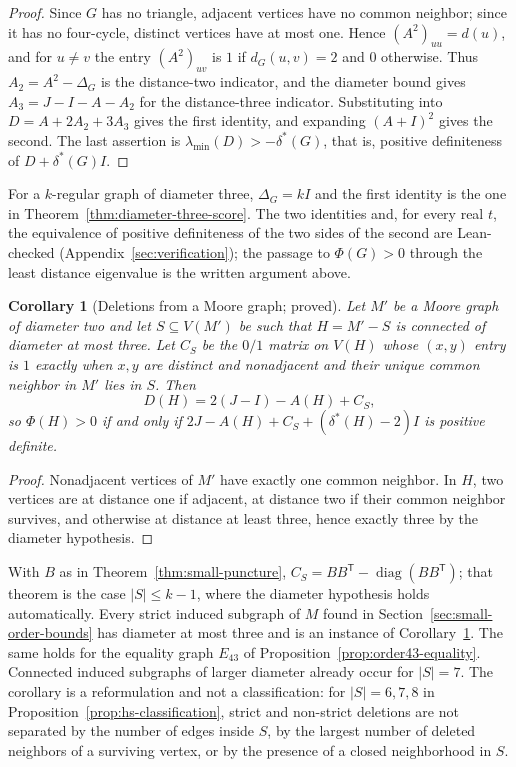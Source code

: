 \documentclass[a4paper,10pt,reqno]{amsart}
\theoremstyle{plain}
\newtheorem{corollary}[theorem]{Corollary}
\theoremstyle{definition}
\theoremstyle{remark}
\begin{document}
\begin{proof}
Since \(G\) has no triangle, adjacent vertices have no common neighbor; since
it has no four-cycle, distinct vertices have at most one. Hence \((A^2)_{uu}=d(u)\),
and for \(u\ne v\) the entry \((A^2)_{uv}\) is \(1\) if \(d_G(u,v)=2\) and \(0\)
otherwise. Thus \(A_2=A^2-\Delta_G\) is the distance-two indicator, and the
diameter bound gives \(A_3=J-I-A-A_2\) for the distance-three indicator.
Substituting into \(D=A+2A_2+3A_3\) gives the first identity, and expanding
\((A+I)^2\) gives the second. The last assertion is
\(\lambda_{\min}(D)>-\delta^*(G)\), that is, positive definiteness of
\(D+\delta^*(G)I\).
\end{proof}

For a \(k\)-regular graph of diameter three, \(\Delta_G=kI\) and the first
identity is the one in Theorem~\ref{thm:diameter-three-score}. The two
identities and, for every real \(t\), the equivalence of positive
definiteness of the two sides of the second are Lean-checked
(Appendix~\ref{sec:verification}); the passage to \(\Phi(G)>0\) through the
least distance eigenvalue is the written argument above.

\begin{corollary}[Deletions from a Moore graph; proved]
\label{cor:moore-deletion-form}
Let \(M'\) be a Moore graph of diameter two and let \(S\subseteq V(M')\) be
such that \(H=M'-S\) is connected of diameter at most three. Let \(C_S\) be
the \(0/1\) matrix on \(V(H)\) whose \((x,y)\) entry is \(1\) exactly when
\(x,y\) are distinct and nonadjacent and their unique common neighbor in
\(M'\) lies in \(S\). Then
\[
 D(H)=2(J-I)-A(H)+C_S,
\]
so \(\Phi(H)>0\) if and only if \(2J-A(H)+C_S+(\delta^*(H)-2)I\) is positive
definite.
\end{corollary}

\begin{proof}
Nonadjacent vertices of \(M'\) have exactly one common neighbor. In \(H\), two
vertices are at distance one if adjacent, at distance two if their common
neighbor survives, and otherwise at distance at least three, hence exactly
three by the diameter hypothesis.
\end{proof}

With \(B\) as in Theorem~\ref{thm:small-puncture}, \(C_S=BB^{\mathsf T}-
\operatorname{diag}(BB^{\mathsf T})\); that theorem is the case \(|S|\le k-1\),
where the diameter hypothesis holds automatically. Every strict induced
subgraph of \(M\) found in Section~\ref{sec:small-order-bounds} has diameter
at most three and is an instance of Corollary~\ref{cor:moore-deletion-form}.
The same holds for the equality graph \(E_{43}\) of
Proposition~\ref{prop:order43-equality}. Connected induced
subgraphs of larger diameter already occur for \(|S|=7\). The corollary is a
reformulation and not a classification: for \(|S|=6,7,8\) in
Proposition~\ref{prop:hs-classification}, strict and non-strict deletions
are not separated by the number of edges inside \(S\), by the largest number
of deleted neighbors of a surviving vertex, or by the presence of a closed
neighborhood in \(S\).
\end{document}
